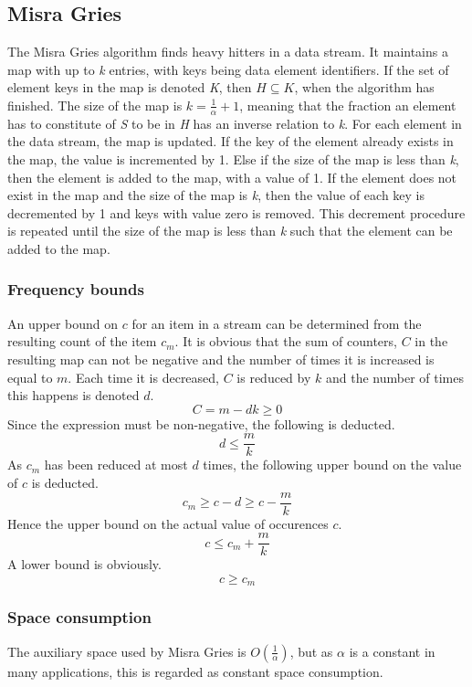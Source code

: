 \subsection{Misra Gries}
\label{sub:misragries}
The Misra Gries algorithm finds heavy hitters in a data stream. It maintains a map with up to \textit{k} entries, with keys being data element identifiers. If the set of element keys in the map is denoted \textit{K}, then \(H \subseteq K\), when the algorithm has finished. The size of the map is \(k = \frac{1}{\alpha} + 1\), meaning that the fraction an element has to constitute of \textit{S} to be in \textit{H} has an inverse relation to \textit{k}.
For each element in the data stream, the map is updated. If the key of the element already exists in the map, the value is incremented by 1. Else if the size of the map is less than \textit{k}, then the element is added to the map, with a value of 1. If the element does not exist in the map and the size of the map is \textit{k}, then the value of each key is decremented by 1 and keys with value zero is removed. This decrement procedure is repeated until the size of the map is less than \textit{k} such that the element can be added to the map.

\subsubsection{Frequency bounds}
An upper bound on \(c\) for an item in a stream can be determined from the resulting count of the item \(c_m\). It is obvious that the sum of counters, \(C\) in the resulting map can not be negative and the number of times it is increased is equal to \(m\). Each time it is decreased, \(C\) is reduced by \(k\) and the number of times this happens is denoted \(d\).\cite{accuracy}
\[C=m-dk\geq 0\]
Since the expression must be non-negative, the following is deducted.
\[d\leq \frac{m}{k}\]
As \(c_m\) has been reduced at most \(d\) times, the following upper bound on the value of \(c\) is deducted.
\[c_m \geq c-d \geq c-\frac{m}{k}\]
Hence the upper bound on the actual value of occurences \(c\).
\[c \leq c_m+\frac{m}{k}\]
A lower bound is obviously.
\[c \geq c_m\]

\subsubsection{Space consumption}
The auxiliary space used by Misra Gries is \(O\left(\frac{1}{\alpha}\right)\), but as \(\alpha\) is a constant in many applications, this is regarded as constant space consumption.
